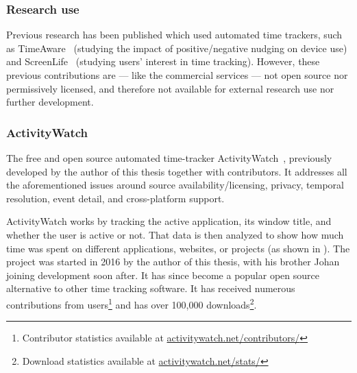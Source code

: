     \subsubsection*{Research use}

        Previous research has been published which used automated time trackers, such as TimeAware~\cite{kim_timeaware_2016} (studying the impact of positive/negative nudging on device use) and ScreenLife~\cite{rooksby_personal_2016} (studying users' interest in time tracking). However, these previous contributions are --- like the commercial services --- not open source nor permissively licensed, and therefore not available for external research use nor further development.

    \subsubsection*{ActivityWatch}

        The free and open source automated time-tracker ActivityWatch~\cite{bjareholt_activitywatch_2020}, previously developed by the author of this thesis together with contributors. It addresses all the aforementioned issues around source availability/licensing, privacy, temporal resolution, event detail, and cross-platform support.

    ActivityWatch works by tracking the active application, its window title, and whether the user is active or not. That data is then analyzed to show how much time was spent on different applications, websites, or projects (as shown in ). The project was started in 2016 by the author of this thesis, with his brother Johan joining development soon after. It has since become a popular open source alternative to other time tracking software. It has received numerous contributions from users\footnote{Contributor statistics available at \href{https://activitywatch.net/contributors/}{activitywatch.net/contributors/}} and has over 100,000 downloads\footnote{Download statistics available at \href{https://activitywatch.net/stats/}{activitywatch.net/stats/}}.

